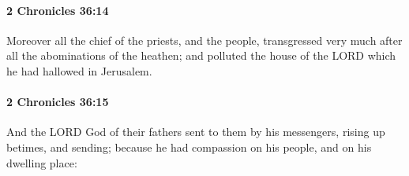 		\paragraph{2 Chronicles 36:14} %
			\label{2CHRONICLES-36-14}

			Moreover all the chief of the priests, and the people, transgressed very much after all the abominations of the heathen; and polluted the house of the LORD which he had hallowed in Jerusalem.


		\paragraph{2 Chronicles 36:15} %
			\label{2CHRONICLES-36-15}

			And the LORD God of their fathers sent to them by his messengers, rising up betimes, and sending; because he had compassion on his people, and on his dwelling place:

